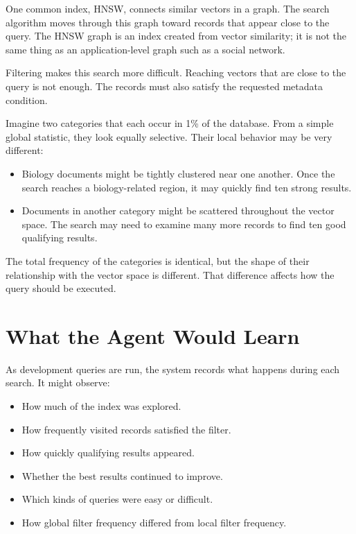\documentclass[11pt]{article}
\begin{document}
One common index, HNSW, connects similar vectors in a graph. The search algorithm moves through this graph toward records that appear close to the query. The HNSW graph is an index created from vector similarity; it is not the same thing as an application-level graph such as a social network.

Filtering makes this search more difficult. Reaching vectors that are close to the query is not enough. The records must also satisfy the requested metadata condition.

Imagine two categories that each occur in 1\% of the database. From a simple global statistic, they look equally selective. Their local behavior may be very different:

\begin{itemize}
    \item Biology documents might be tightly clustered near one another. Once the search reaches a biology-related region, it may quickly find ten strong results.
    \item Documents in another category might be scattered throughout the vector space. The search may need to examine many more records to find ten good qualifying results.
\end{itemize}

The total frequency of the categories is identical, but the shape of their relationship with the vector space is different. That difference affects how the query should be executed.

\section{What the Agent Would Learn}

As development queries are run, the system records what happens during each search. It might observe:

\begin{itemize}
    \item How much of the index was explored.
    \item How frequently visited records satisfied the filter.
    \item How quickly qualifying results appeared.
    \item Whether the best results continued to improve.
    \item Which kinds of queries were easy or difficult.
    \item How global filter frequency differed from local filter frequency.
\end{itemize}
\end{document}
